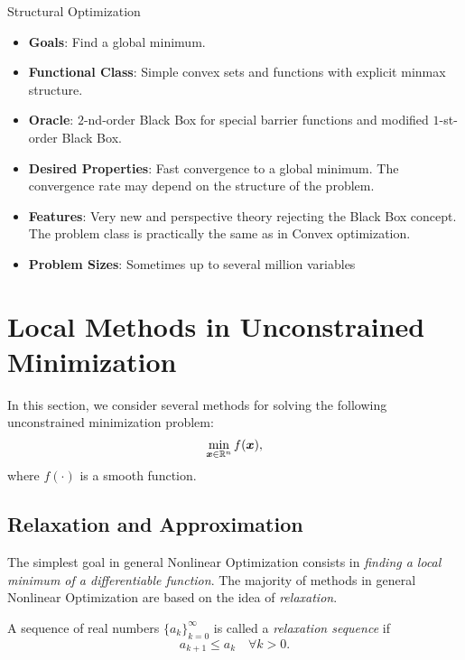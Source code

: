\begin{colorboxnote}{Structural Optimization}
    \begin{itemize}
        \item \textbf{Goals}: Find a global minimum.
        \item \textbf{Functional Class}: Simple convex sets and functions with explicit minmax structure.
        \item \textbf{Oracle}: \(2\)-nd-order Black Box for special barrier functions and modified \(1\)-st-order Black Box.
        \item \textbf{Desired Properties}: Fast convergence to a global minimum. The convergence rate may depend on the structure of the problem.
        \item \textbf{Features}: Very new and perspective theory rejecting the Black Box concept. The problem class is practically the same as in Convex optimization.
        \item \textbf{Problem Sizes}: Sometimes up to several million variables
    \end{itemize}
\end{colorboxnote}

\newpage

\section{Local Methods in Unconstrained Minimization}\label{sec:local_methods_in_unconstrained_min}

In this section, we consider several methods for solving the following unconstrained minimization problem:
\begin{equation}\label{eq:unconstrained_nonlinear_problem}
    \min_{\bm{x} \in \mathbb{R}^n} f(\bm{x}),
\end{equation}
where \(f(\cdot)\) is a smooth function.

\subsection{Relaxation and Approximation}\label{subsec:relax_approx}

The simplest goal in general Nonlinear Optimization consists in \emph{finding a local minimum of a differentiable function}. 
The majority of methods in general Nonlinear Optimization are based on the idea of \emph{relaxation}.

\begin{defn}[Relaxation]\label{defn:relaxation}
    A sequence of real numbers \(\{ a_k \}_{k=0}^\infty\) is called a \emph{relaxation sequence} if 
    \[
        a_{k+1} \le a_k \quad \forall k > 0. 
    \]
\end{defn}


